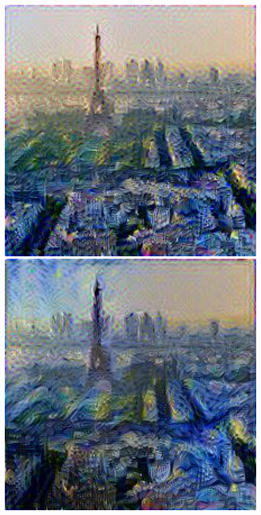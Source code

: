 \documentclass{article}
\begin{document}
\begin{figure}[!htb]
\begin{minipage}{0.16\textwidth}
\end{minipage}%
\begin{minipage}{0.16\textwidth}
\centering
\includegraphics[width=0.98\textwidth]{../Images/transfer/paris_starrynight_1e2_500.jpg}
\end{minipage}%
\begin{minipage}{0.16\textwidth}
\centering
\includegraphics[width=0.98\textwidth]{../Images/transfer/paris_starrynight_1e3_500.jpg}

\end{minipage}
\end{figure}
\end{document}
